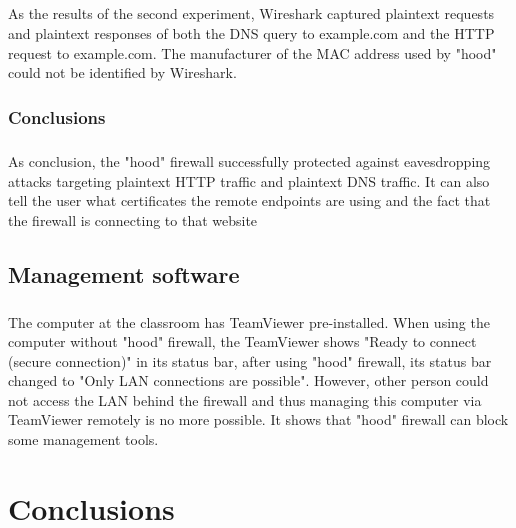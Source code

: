 \documentclass[mscthesis]{usiinfthesis}
\begin{document}
\paragraph{}
As the results of the second experiment, Wireshark captured plaintext requests and plaintext responses of both the DNS query to example.com and the HTTP request to example.com. The manufacturer of the MAC address used by "hood" could not be identified by Wireshark.

\subsection{Conclusions}
\paragraph{}
As conclusion, the "hood" firewall successfully protected against eavesdropping attacks targeting plaintext HTTP traffic and plaintext DNS traffic. It can also tell the user what certificates the remote endpoints are using and the fact that the firewall is connecting to that website

\section{Management software}
\paragraph{}
The computer at the classroom has TeamViewer pre-installed. When using the computer without "hood" firewall, the TeamViewer shows "Ready to connect (secure connection)" in its status bar, after using "hood" firewall, its status bar changed to "Only LAN connections are possible". However, other person could not access the LAN behind the firewall and thus managing this computer via TeamViewer remotely is no more possible. It shows that "hood" firewall can block some management tools.

\chapter{Conclusions}\label{cha:conclustion}
\end{document}
